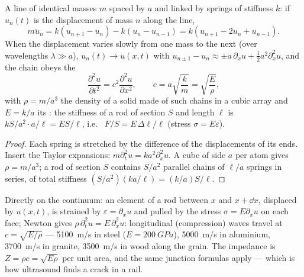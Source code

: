 \begin{proposition}\label{prop:b2:waves-on-strings:chain}
A line of identical masses $m$ spaced by $a$ and linked by springs of
stiffness $k$: if $u_n(t)$ is the displacement of mass $n$ along the
line,
\[
m\ddot u_n = k(u_{n+1} - u_n) - k(u_n - u_{n-1}) = k(u_{n+1} - 2u_n + u_{n-1}) .
\]
When the displacement varies slowly from one mass to the next (over
wavelengths $\lambda \gg a$), $u_n(t) \to u(x, t)$ with $u_{n\pm1} - u_n \approx
\pm a\,\partial_xu + \tfrac12a^2\partial_x^2u$, and the chain obeys the 
\[
\frac{\partial^2u}{\partial t^2} = c^2\frac{\partial^2u}{\partial x^2} , \qquad
c = a\sqrt{\frac km} = \sqrt{\frac{E}{\rho}} ,
\]
with $\rho = m/a^3$ the density of a solid made of such chains in a
cubic array and $E = k/a$ its \emph{}: the stiffness of
a rod of section $S$ and length $\ell$ is $kS/a^2\cdot a/\ell = ES/\ell$,
i.e.\ \emph{} $F/S = E\,\Delta\ell/\ell$ (stress $\sigma = E\varepsilon$).
\end{proposition}

\begin{proof}
Each spring is stretched by the difference of the displacements of its
ends. Insert the Taylor expansions: $m\partial_t^2u = ka^2\partial_x^2u$. A cube of
side $a$ per atom gives $\rho = m/a^3$; a rod of section $S$ contains
$S/a^2$ parallel chains of $\ell/a$ springs in series, of total stiffness
$(S/a^2)(ka/\ell) = (k/a)S/\ell$.
\end{proof}

\begin{proposition}\label{prop:b2:waves-on-strings:rod}
Directly on the continuum: an element of a rod between $x$ and $x +
\dd x$, displaced by $u(x, t)$, is strained by $\varepsilon = \partial_xu$ and pulled
by the stress $\sigma = E\partial_xu$ on each face; Newton gives $\rho\,\partial_t^2u =
E\,\partial_x^2u$: longitudinal (compression) waves travel at $c = \sqrt{E/\rho}$
--- \qty{5100}{m/s} in steel ($E = \qty{200}{GPa}$), \qty{5000}{m/s} in aluminium,
\qty{3700}{m/s} in granite, \qty{3500}{m/s} in wood along the grain. The
impedance is $Z = \rho c = \sqrt{E\rho}$ per unit area, and the same
junction formulas apply --- which is how ultrasound finds a crack in a
rail.
\end{proposition}

